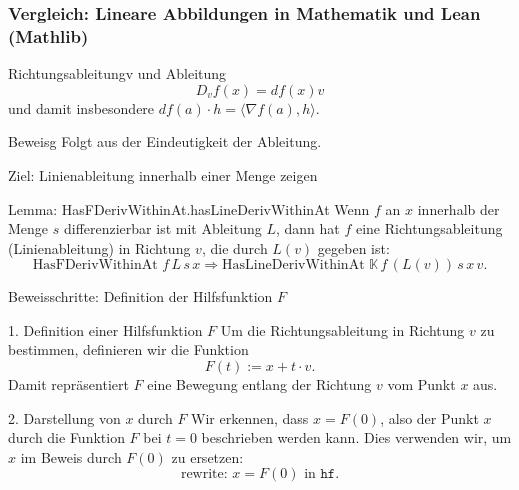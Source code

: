 \documentclass{beamer}
\begin{document}
    \begin{frame}
        \frametitle{Vergleich: Lineare Abbildungen in Mathematik und Lean (Mathlib)}
        
        
        \begin{block}{Richtungsableitungv und Ableitung}
            \[
                D_v f (x) = df(x) v
            \]
            und damit insbesondere  $df(a) \cdot h = \langle \nabla f (a) , h \rangle$.
        \end{block}

        \begin{block}{Beweisg}
            Folgt aus der Eindeutigkeit der Ableitung.
        \end{block}
    \end{frame}


 
    


    \begin{frame}{Ziel: Linienableitung innerhalb einer Menge zeigen}
        \begin{block}{Lemma: HasFDerivWithinAt.hasLineDerivWithinAt}
            Wenn \( f \) an \( x \) innerhalb der Menge \( s \) differenzierbar ist mit Ableitung \( L \), dann hat \( f \) eine Richtungsableitung (Linienableitung) in Richtung \( v \), die durch \( L(v) \) gegeben ist:
            \[
            \text{HasFDerivWithinAt } f \, L \, s \, x \Rightarrow \text{HasLineDerivWithinAt } \mathbb{K} \, f \, (L(v)) \, s \, x \, v.
            \]
        \end{block}
    \end{frame}
    
    \begin{frame}{Beweisschritte: Definition der Hilfsfunktion \( F \)}
        \begin{block}{1. Definition einer Hilfsfunktion \( F \)}
            Um die Richtungsableitung in Richtung \( v \) zu bestimmen, definieren wir die Funktion
            \[
            F(t) := x + t \cdot v.
            \]
            Damit repräsentiert \( F \) eine Bewegung entlang der Richtung \( v \) vom Punkt \( x \) aus.
        \end{block}
    
        \begin{block}{2. Darstellung von \( x \) durch \( F \)}
            Wir erkennen, dass \( x = F(0) \), also der Punkt \( x \) durch die Funktion \( F \) bei \( t = 0 \) beschrieben werden kann. Dies verwenden wir, um \( x \) im Beweis durch \( F(0) \) zu ersetzen:
            \[
            \text{rewrite: } x = F(0) \text{ in } \texttt{hf}.
            \]
        \end{block}
    \end{frame}
    
\end{document}
